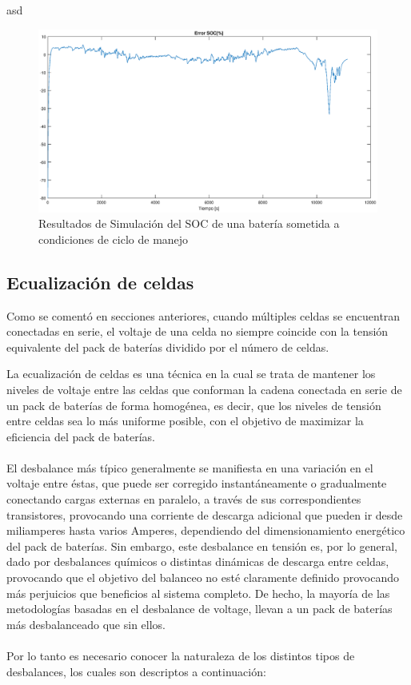 \documentclass[10pt,a4paper]{article}
\begin{document}
	asd
	\begin{figure}[h!]
		\begin{center}
			\includegraphics[width=1\textwidth]{soc_error_porc.eps}
			\caption{Resultados de Simulación del SOC de una batería sometida a condiciones de ciclo de manejo}
			\label{error_SOC_Sim}
		\end{center}
	\end{figure}
	
	\clearpage
	
	\subsection{Ecualización de celdas}
	
	\noindent Como se comentó en secciones anteriores, cuando múltiples celdas se encuentran conectadas en serie, el voltaje de una celda no siempre coincide con la tensión equivalente del pack de baterías dividido por el número de celdas. 
	
	\noindent La ecualización de celdas es una técnica en la cual se trata de mantener los niveles de voltaje entre las celdas que conforman la cadena conectada en serie de un pack de baterías de forma homogénea, es decir, que los niveles de tensión entre celdas sea lo más uniforme posible, con el objetivo de maximizar la eficiencia del pack de baterías.\\
	\\
	\noindent El desbalance más típico generalmente se manifiesta en una variación en el voltaje entre éstas, que puede ser corregido instantáneamente o gradualmente conectando cargas externas en paralelo, a través de sus correspondientes transistores, provocando una corriente de descarga adicional que pueden ir desde miliamperes hasta varios Amperes, dependiendo del dimensionamiento energético del pack de baterías. Sin embargo, este desbalance en tensión es, por lo general, dado por desbalances químicos o distintas dinámicas de descarga entre celdas, provocando que el objetivo del balanceo no esté claramente definido provocando más perjuicios que beneficios al sistema completo. De hecho, la mayoría de las metodologías basadas en el desbalance de voltage, llevan a un pack de baterías más desbalanceado que sin ellos.\\
	\\
	\noindent Por lo tanto es necesario conocer la naturaleza de los distintos tipos de desbalances, los cuales son descriptos a continuación:
	
\end{document}
